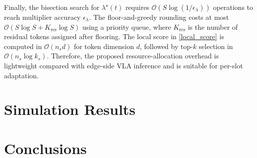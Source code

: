 \documentclass[lettersize,journal]{IEEEtran}
\theoremstyle{custom}
\begin{document}
Finally, the bisection search for $\lambda^{\star}(t)$ requires $\mathcal{O}(S\log(1/\epsilon_{\lambda}))$ operations to reach multiplier accuracy $\epsilon_{\lambda}$. The floor-and-greedy rounding costs at most $\mathcal{O}(S\log S+K_{\mathrm{res}}\log S)$ using a priority queue, where $K_{\mathrm{res}}$ is the number of residual tokens assigned after flooring. The local score in \eqref{local_score} is computed in $\mathcal{O}(n_s d)$ for token dimension $d$, followed by top-$k$ selection in $\mathcal{O}(n_s\log k_s)$. Therefore, the proposed resource-allocation overhead is lightweight compared with edge-side VLA inference and is suitable for per-slot adaptation.

\section{Simulation Results}

\section{Conclusions}


 

% 







\end{document}
